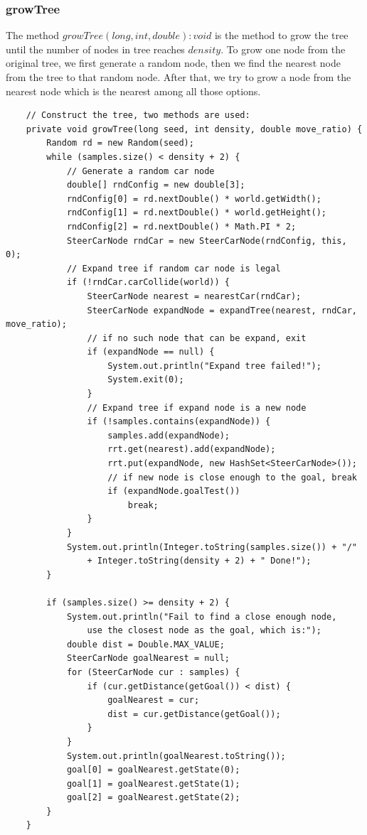 \documentclass{article}
\begin{document}
\subsubsection{growTree}
The method $growTree(long, int, double) : void$ is the method to grow the tree until the number of nodes in tree reaches $density$. To grow one node from the original tree, we first generate a random node, then we find the nearest node from the tree to that random node. After that, we try to grow a node from the nearest node which is the nearest among all those options.
\begin{lstlisting}
	// Construct the tree, two methods are used:
	private void growTree(long seed, int density, double move_ratio) {
		Random rd = new Random(seed);
		while (samples.size() < density + 2) {
			// Generate a random car node
			double[] rndConfig = new double[3];
			rndConfig[0] = rd.nextDouble() * world.getWidth();
			rndConfig[1] = rd.nextDouble() * world.getHeight();
			rndConfig[2] = rd.nextDouble() * Math.PI * 2;
			SteerCarNode rndCar = new SteerCarNode(rndConfig, this, 0);
			// Expand tree if random car node is legal
			if (!rndCar.carCollide(world)) {
				SteerCarNode nearest = nearestCar(rndCar);
				SteerCarNode expandNode = expandTree(nearest, rndCar, move_ratio);
				// if no such node that can be expand, exit
				if (expandNode == null) {
					System.out.println("Expand tree failed!");
					System.exit(0);
				}
				// Expand tree if expand node is a new node
				if (!samples.contains(expandNode)) {
					samples.add(expandNode);
					rrt.get(nearest).add(expandNode);
					rrt.put(expandNode, new HashSet<SteerCarNode>());
					// if new node is close enough to the goal, break
					if (expandNode.goalTest())
						break;
				}
			}
			System.out.println(Integer.toString(samples.size()) + "/" 
				+ Integer.toString(density + 2) + " Done!");
		}

		if (samples.size() >= density + 2) {
			System.out.println("Fail to find a close enough node, 
				use the closest node as the goal, which is:");
			double dist = Double.MAX_VALUE;
			SteerCarNode goalNearest = null;
			for (SteerCarNode cur : samples) {
				if (cur.getDistance(getGoal()) < dist) {
					goalNearest = cur;
					dist = cur.getDistance(getGoal());
				}
			}
			System.out.println(goalNearest.toString());
			goal[0] = goalNearest.getState(0);
			goal[1] = goalNearest.getState(1);
			goal[2] = goalNearest.getState(2);
		}
	}
\end{lstlisting}
\end{document}
